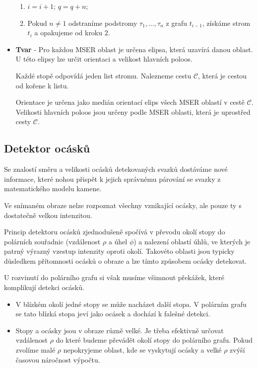\begin{itemize}
\begin{enumerate}
	\item $i = i+1$; $q = q+n$;
	\item Pokud $n \neq 1$ odstraníme podstromy $\tau_1,\dots,\tau_n$ z grafu $t_{i-1}$, získáme strom  $t_i$ a opakujeme od kroku $2$. 
	
\end{enumerate}	
	\item \textbf{Tvar} -  Pro každou MSER oblast je určena elipsa, která uzavírá danou oblast. U této elipsy lze určit orientaci a velikost hlavních poloos. 
	
	Každé stopě odpovídá jeden list stromu. Nalezneme cestu $\mathcal{C}$, která je cestou od kořene k listu. 	
	
	Orientace je určena jako medián orientací elips všech MSER oblastí v cestě $\mathcal{C}$. Velikosti hlavních poloos jsou určeny podle MSER oblasti, která je uprostřed cesty $\mathcal{C}$.		
		
\end{itemize}

	
	
	
\subsection{Detektor ocásků}
\label{sec:tails}
	Se znalostí směru a velikosti ocásků detekovaných svazků dostáváme nové informace, které nohou přispět k jejich správnému párování se svazky z matematického modelu kamene.
	
	Ve snímaném obraze nelze rozpoznat všechny vznikající ocásky, ale pouze ty s dostatečně velkou intenzitou.

	Princip detektoru ocásků zjednodušeně spočívá v převodu okolí stopy do polárních souřadnic (vzdálenost $\rho$ a úhel $\phi$) a nalezení oblastí úhlů, ve kterých je patrný výrazný vzestup intenzity oproti okolí. Takovéto oblasti jsou typicky důsledkem přítomnosti ocásků o obraze a lze tímto způsobem ocásky detekovat. 
	
	 U rozvinutí do polárního grafu si však musíme všimnout překážek, které komplikují detekci ocásků.  
	 \begin{itemize}	 	
	 	\item V blízkém okolí jedné stopy se může nacházet další stopa. V polárním grafu se tato blízká stopa jeví jako ocásek a dochází k falešné detekci.	
	 	\item Stopy a ocásky jsou v obraze různě velké. Je třeba efektivně určovat vzdálenost $\rho$ do které budeme převádět okolí stopy do polárního grafu. Pokud zvolíme malé $\rho$ nepokryjeme oblast, kde se vyskytují ocásky a velké $\rho$ zvýší časovou náročnost výpočtu.   	
	\end{itemize}
	
